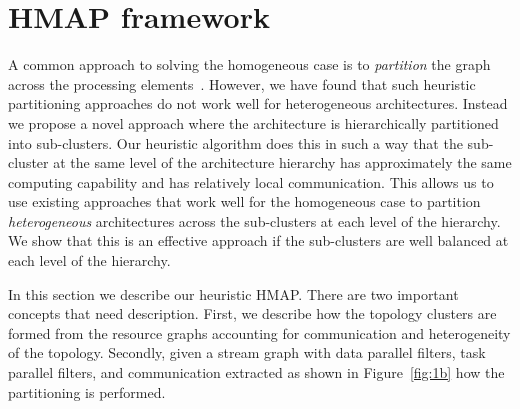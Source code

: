 \documentclass[10pt, conference, compsocconf, reqno]{IEEEtran}
\begin{document}

\section{HMAP framework}
\label{sec:our-framework}

A common approach to solving the homogeneous case is to
\textit{partition} the graph across the processing
elements~\cite{aale01,kpur99,enys98}.  However, we have found that such
heuristic partitioning approaches do not work well for heterogeneous
architectures. Instead we propose a novel approach where the
architecture is hierarchically partitioned into sub-clusters.
Our heuristic algorithm does this in such a way that the
sub-cluster at the same level of the architecture hierarchy has
approximately the same computing capability and has relatively local
communication. This allows us to use existing approaches that work well
for the homogeneous case to partition \textit{heterogeneous}
architectures across the sub-clusters at each level of the hierarchy. We
show that this is an effective approach if the sub-clusters are well
balanced at each level of the hierarchy.

In this section we describe our heuristic HMAP. There are two
important concepts that need description. First, we describe how the
topology clusters are formed from the resource graphs accounting for
communication and heterogeneity of the topology. Secondly, given a
stream graph with data parallel filters, task parallel filters, and
communication extracted as shown in Figure~\ref{fig:1b} how the partitioning
is performed.
\end{document}
